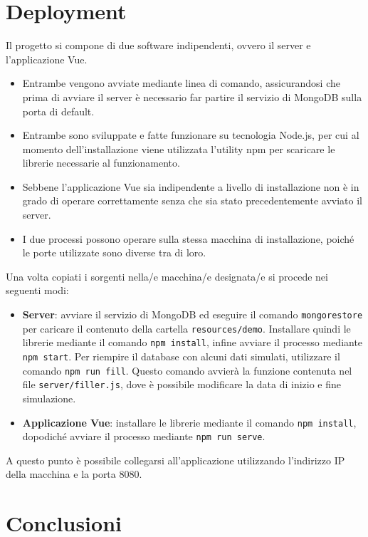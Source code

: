 \documentclass[a4paper]{report}
\begin{document}
\chapter{Deployment}

Il progetto si compone di due software indipendenti, ovvero il server e l’applicazione Vue.

\begin{itemize}
\item Entrambe vengono avviate mediante linea di comando, assicurandosi che prima di avviare il server è necessario far partire il servizio di MongoDB sulla porta di default.
\item Entrambe sono sviluppate e fatte funzionare su tecnologia Node.js, per cui al momento dell’installazione viene utilizzata l’utility npm per scaricare le librerie necessarie al funzionamento.
\item Sebbene l’applicazione Vue sia indipendente a livello di installazione non è in grado di operare correttamente senza che sia stato precedentemente avviato il server.
\item I due processi possono operare sulla stessa macchina di installazione, poiché le porte utilizzate sono diverse tra di loro.
\end{itemize}

Una volta copiati i sorgenti nella/e macchina/e designata/e si procede nei seguenti modi:

\begin{itemize}
\item \textbf{Server}: avviare il servizio di MongoDB ed eseguire il comando \texttt{mongorestore} per caricare il contenuto della cartella \texttt{resources/demo}. Installare quindi le librerie mediante il comando \texttt{npm install}, infine avviare il processo mediante \texttt{npm start}.
Per riempire il database con alcuni dati simulati, utilizzare il comando \texttt{npm run fill}. Questo comando avvierà la funzione contenuta nel file \texttt{server/filler.js}, dove è possibile modificare la data di inizio e fine simulazione.
\item \textbf{Applicazione Vue}: installare le librerie mediante il comando \texttt{npm install}, dopodiché avviare il processo mediante \texttt{npm run serve}.
\end{itemize}

A questo punto è possibile collegarsi all’applicazione utilizzando l’indirizzo IP della macchina e la porta 8080.

\chapter{Conclusioni}
\end{document}

